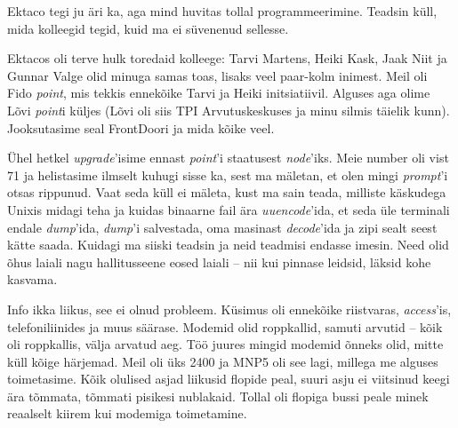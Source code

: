 
Ektaco tegi ju äri ka, aga mind huvitas tollal 
programmeerimine. Teadsin küll, mida kolleegid tegid, kuid ma 
ei süvenenud sellesse.


Ektacos oli terve hulk toredaid kolleege: 
Tarvi Martens, Heiki Kask, Jaak 
Niit ja Gunnar Valge olid 
minuga samas toas, lisaks veel paar-kolm inimest. Meil oli 
Fido \emph{point}, mis tekkis ennekõike Tarvi ja Heiki 
initsiatiivil. Alguses aga olime Lõvi \emph{point}i küljes 
(Lõvi oli siis TPI 
Arvutuskeskuses ja minu silmis täielik
kunn). Jooksutasime seal FrontDoori ja mida kõike veel. 

Ühel hetkel \emph{upgrade}'isime ennast \emph{point}'i staatusest 
\emph{node}'iks. Meie number oli vist 71 ja helistasime ilmselt
kuhugi sisse ka, sest ma mäletan, et olen mingi \emph{prompt}'i otsas 
rippunud. Vaat seda küll ei mäleta, kust ma sain teada, milliste käskudega 
Unixis midagi teha ja kuidas binaarne fail ära 
\emph{uuencode}'ida, et seda üle terminali endale 
\emph{dump}'ida, \emph{dump}'i salvestada, oma masinast \emph{decode}'ida ja 
zipi sealt seest kätte saada. Kuidagi ma siiski teadsin ja neid teadmisi endasse
imesin. Need olid 
õhus laiali nagu hallitusseene eosed laiali – nii kui pinnase 
leidsid, läksid kohe kasvama. 


Info ikka liikus, see ei olnud probleem. Küsimus oli 
ennekõike riistvaras, \emph{access}'is, telefoniliinides ja muus säärase. Modemid olid roppkallid, samuti arvutid – kõik oli roppkallis, 
välja arvatud aeg. Töö juures mingid modemid õnneks olid, mitte küll 
kõige härjemad. Meil oli üks 2400 ja MNP5 oli see lagi, millega me alguses toimetasime. 
Kõik olulised asjad liikusid flopide peal, suuri asju ei viitsinud keegi 
ära tõmmata, tõmmati pisikesi nublakaid. Tollal oli flopiga bussi peale 
minek reaalselt kiirem kui modemiga toimetamine.

